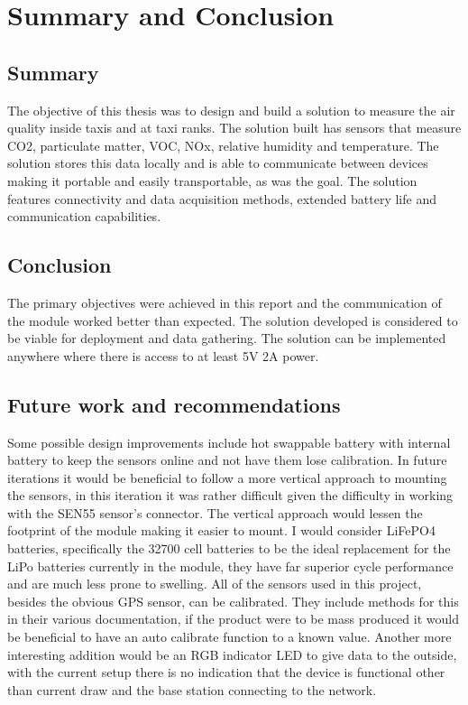\graphicspath{{conclusion/fig/}}

\chapter{Summary and Conclusion}
\label{chap:conclusion}
\vspace{-3em}
\section{Summary}

The objective of this thesis was to design and build a solution to measure the air quality inside taxis and at taxi ranks. The solution built has sensors that measure CO2, particulate matter, VOC, NOx, relative humidity and temperature. The solution stores this data locally and is able to communicate between devices making it portable and easily transportable, as was the goal. The solution features connectivity and data acquisition methods, extended battery life and communication capabilities.


\section{Conclusion}
\noindent
The primary objectives were achieved in this report and the communication of the module worked better than expected. The solution developed is considered to be viable for deployment and data gathering. The solution can be implemented anywhere where there is access to at least 5V 2A power.
\section{Future work and recommendations}
Some possible design improvements include hot swappable battery with internal battery to keep the sensors online and not have them lose calibration. In future iterations it would be beneficial to follow a more vertical approach to mounting the sensors, in this iteration it was rather difficult given the difficulty in working with the SEN55 sensor's connector. The vertical approach would lessen the footprint of the module making it easier to mount. I would consider LiFePO4 batteries, specifically the 32700 cell batteries to be the ideal replacement for the LiPo batteries currently in the module, they have far superior cycle performance and are much less prone to swelling. All of the sensors used in this project, besides the obvious GPS sensor, can be calibrated. They include methods for this in their various documentation, if the product were to be mass produced it would be beneficial to have an auto calibrate function to a known value. Another more interesting addition would be an RGB indicator LED to give data to the outside, with the current setup there is no indication that the device is functional other than current draw and the base station connecting to the network.